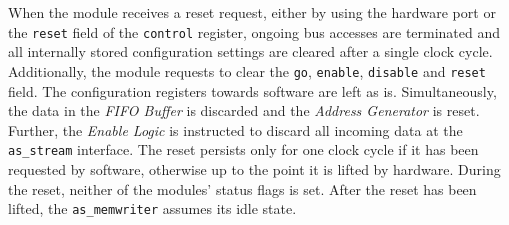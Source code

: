 When the module receives a reset request, either by using the hardware port or the \texttt{reset} field of the \texttt{control} register, ongoing bus accesses are terminated and all internally stored configuration settings are cleared after a single clock cycle.
Additionally, the module requests to clear the \texttt{go}, \texttt{enable}, \texttt{disable} and \texttt{reset} field.
The configuration registers towards software are left as is.
Simultaneously, the data in the \textit{FIFO Buffer} is discarded and the \textit{Address Generator} is reset.
Further, the \textit{Enable Logic} is instructed to discard all incoming data at the \texttt{as\_stream} interface.
The reset persists only for one clock cycle if it has been requested by software, otherwise up to the point it is lifted by hardware.
During the reset, neither of the modules' status flags is set.
After the reset has been lifted, the \texttt{as\_memwriter} assumes its idle state.


